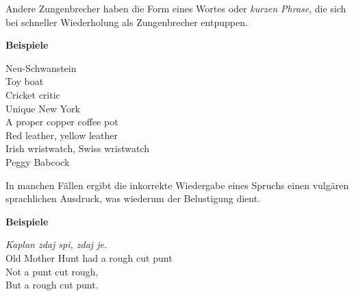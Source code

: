 \documentclass[
  letterpaper,
]{scrbook}
\begin{document}
Andere Zungenbrecher haben die Form eines Wortes oder \emph{kurzen
Phrase}, die sich bei schneller Wiederholung als Zungenbrecher
entpuppen.

\begin{tcolorbox}[enhanced jigsaw, rightrule=.15mm, arc=.35mm, breakable, colframe=quarto-callout-note-color-frame, left=2mm, colback=white, bottomrule=.15mm, toprule=.15mm, leftrule=.75mm, opacityback=0]
\begin{minipage}[t]{5.5mm}
\textcolor{quarto-callout-note-color}{\faInfo}
\end{minipage}%
\begin{minipage}[t]{\textwidth - 5.5mm}

\textbf{Beispiele}\vspace{2mm}

Neu-Schwanstein\\

Toy boat\\
Cricket critic\\
Unique New York\\
A proper copper coffee pot\\
Red leather, yellow leather\\
Irish wristwatch, Swiss wristwatch\\
Peggy Babcock\\

\end{minipage}%
\end{tcolorbox}

In manchen Fällen ergibt die inkorrekte Wiedergabe eines Spruchs einen
vulgären sprachlichen Ausdruck, was wiederum der Belustigung dient.

\begin{tcolorbox}[enhanced jigsaw, rightrule=.15mm, arc=.35mm, breakable, colframe=quarto-callout-note-color-frame, left=2mm, colback=white, bottomrule=.15mm, toprule=.15mm, leftrule=.75mm, opacityback=0]
\begin{minipage}[t]{5.5mm}
\textcolor{quarto-callout-note-color}{\faInfo}
\end{minipage}%
\begin{minipage}[t]{\textwidth - 5.5mm}

\textbf{Beispiele}\vspace{2mm}

\emph{Kaplan zdaj spi, zdaj je.}\\

Old Mother Hunt had a rough cut punt\\
Not a punt cut rough,\\
But a rough cut punt.\\

\end{minipage}%
\end{tcolorbox}
\end{document}
